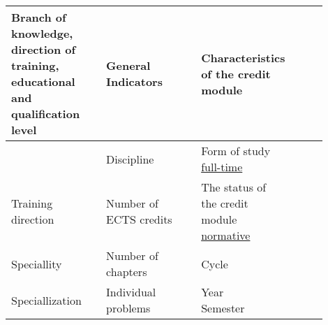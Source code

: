 \documentclass{rnp}
\begin{document}
\begin{center}\small
\begin{tabular}{| *3{>{\centering\arraybackslash}m{0.3\linewidth}|} @{}m{0pt}@{}}
	\hline
	  \textbf{Branch of knowledge, direction of training, educational and qualification level}                             
	& \textbf{General Indicators}                                  
	& \textbf{Characteristics of the credit module}                        
	&  \\[6ex] \hline
	  \parbox{\linewidth}{}                                                 
	& \parbox{\linewidth}{\centering Discipline \\\underline{\discipline}}                                                   
	& \parbox{\linewidth}{\centering Form of study \underline{full-time}} 
	&  \\[6ex] \hline
	\parbox{\linewidth}{\centering Training direction \\\napriam}                                          
	& \parbox{\linewidth}{\centering Number of \\ ECTS credits \\ \underline{\kredits}} 
	& \parbox{\linewidth}{\centering The status of the credit module \\ \underline{normative}}                                                                
	&  \\[6ex] \hline
	\parbox{\linewidth}{\centering Speciallity  \\\spetsialnist}                                        
	& \parbox{\linewidth}{\centering Number of chapters  \\ \underline{}}                                                             
	& \parbox{\linewidth}{\centering Cycle \cycle}                                                                 
	&  \\[6ex] \hline
	\parbox{\linewidth}{\centering Speciallization   \\\spetsializatsija}                                   
	& \parbox{\linewidth}{\centering Individual problems \\ }                                                              
	& \parbox{\linewidth}{Year \mfield{2cm}{}{}{\the\year}{} \\ Semester \mfield{2cm}{}{}{\semestr}{} }                                                                
	&  \\[6ex] \hline

\end{tabular}
\end{center}
\end{document}
